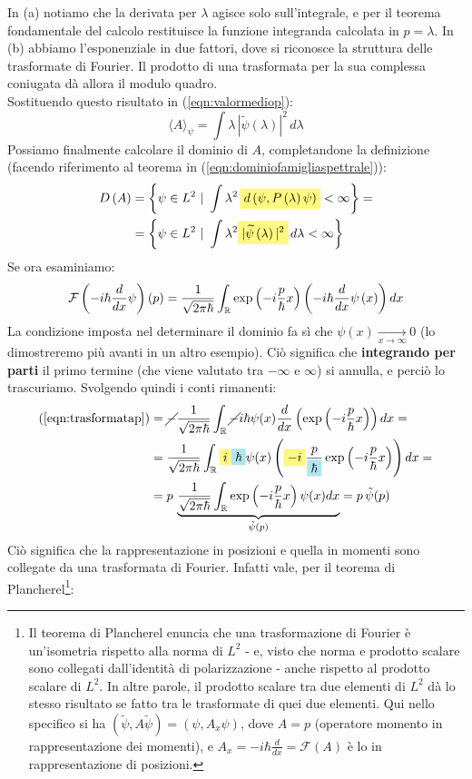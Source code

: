 \documentclass[../../FisicaTeorica.tex]{subfiles}
\begin{document}
In (a) notiamo che la derivata per $\lambda$ agisce solo sull'integrale, e per il teorema fondamentale del calcolo restituisce la funzione integranda calcolata in $p = \lambda$. In (b) abbiamo  l'esponenziale in due fattori, dove si riconosce la struttura delle trasformate di Fourier. Il prodotto di una trasformata per la sua complessa coniugata dà allora il modulo quadro.\\
Sostituendo questo risultato in (\ref{eqn:valormediop}):
\[
\langle A \rangle_\psi = \int \lambda\, |\tilde{\psi}(\lambda)|^2\, d\lambda
\]
Possiamo finalmente calcolare il dominio di $A$, completandone la definizione (facendo riferimento al teorema in (\ref{eqn:dominiofamigliaspettrale})):
\begin{align*}
D\left(A\right)&= \left\{\psi\in L^2\ |\ \int\lambda^2\, \hlc{Yellow}{d\left(\psi,P\left(\lambda\right)\psi\right)}<\infty\right\}=\\
&=\left\{\psi\in L^2\ |\ \int\lambda^2 \hlc{Yellow}{|\widetilde{\psi}\left(\lambda\right)|^2}\,d\lambda<\infty\right\} 
\end{align*}
Se ora esaminiamo:
\begin{equation}
\mathcal{F}\left(-i\hbar\frac{d}{dx}\psi\right)\left(p\right)=\frac{1}{\sqrt{2\pi\hbar}}\int_{\mathbb{R}} \exp\left (-i\frac{p}{\hbar}x\right )\left(-i\hbar\frac{d}{dx}\psi\left(x\right)\right)dx 
\label{eqn:trasformatap}
\end{equation}
La condizione imposta nel determinare il dominio fa sì che $\psi \left(x\right)\xrightarrow[x\to \infty]{} 0$ (lo dimostreremo più avanti in un altro esempio). Ciò significa che \textbf{integrando per parti} il primo termine (che viene valutato tra $-\infty$ e $\infty$) si annulla, e perciò lo trascuriamo. Svolgendo quindi i conti rimanenti:
\begin{align*}
(\ref{eqn:trasformatap}) &= \cancel{-}\frac{1}{\sqrt{2\pi\hbar}}\int_\bb{R} \cancel{-}i\hbar \psi(x) \frac{d}{dx}\left(\exp\left(-i\frac{p}{\hbar}x\right)\right)dx =\\
&= \frac{1}{\sqrt{2\pi\hbar}} \int_\bb{R} \hlc{Yellow}{i} \hlc{SkyBlue}{\hbar} \psi(x) \left(\hlc{Yellow}{-i}\frac{p}{\hlc{SkyBlue}{\hbar}}\exp\left ( -i\frac{p}{\hbar}x\right ) \right )dx=\\
&= p\,\underbrace{\frac{1}{\sqrt{2\pi\hbar}}\int_\bb{R}\exp\left(-i\frac{p}{\hbar}x\right ) \psi(x) dx}_{\tilde{\psi}(p)} = p\,\tilde{\psi}(p)
\end{align*}
Ciò significa che la rappresentazione in posizioni e quella in momenti sono collegate da una trasformata di Fourier. Infatti vale, per il teorema di Plancherel\footnote{Il teorema di Plancherel enuncia che una trasformazione di Fourier è un'isometria rispetto alla norma di $L^2$ - e, visto che norma e prodotto scalare sono collegati dall'identità di polarizzazione - anche rispetto al prodotto scalare di $L^2$. In altre parole, il prodotto scalare tra due elementi di $L^2$ dà lo stesso risultato se fatto tra le trasformate di quei due elementi. Qui nello specifico si ha $(\tilde{\psi},A\tilde{\psi}) = (\psi, A_x \psi)$, dove $A=p$ (operatore momento in rappresentazione dei momenti), e $A_x = -i\hbar \frac{d}{dx} = \mathcal{F}(A)$ è lo  in rappresentazione di posizioni.}:
\end{document}
